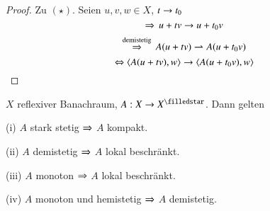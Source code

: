 \begin{proof}
    Zu $(\star)$. Seien $u,v,w\in X$, $t\rightarrow t_0$ 
    \[
        \Rightarrow\, u+tv \rightarrow u+t_0v
    \]
    \[
        \overset{\text{demistetig}}{\Rightarrow} \, A(u+tv) \rightharpoonup A(u+t_0v)
    \]
    \[
        \Leftrightarrow \langle A(u+tv),w\rangle\rightarrow \langle A(u+t_0v),w\rangle
    \]
\end{proof}

\begin{lem}\label{4.4}
    $X$ reflexiver Banachraum, $A:X\ra X^\star$. Dann gelten
    \begin{description}
        \item{(i)}
        $A$ stark stetig $\Rightarrow$ $A$ kompakt.
        \item{(ii)}
        $A$ demistetig $\Rightarrow$ $A$ lokal beschränkt.
        \item{(iii)}
        $A$ monoton $\Rightarrow$ $A$ lokal beschränkt.
        \item{(iv)}
        $A$ monoton und hemistetig $\Rightarrow$ $A$ demistetig.
    \end{description}
\end{lem}

